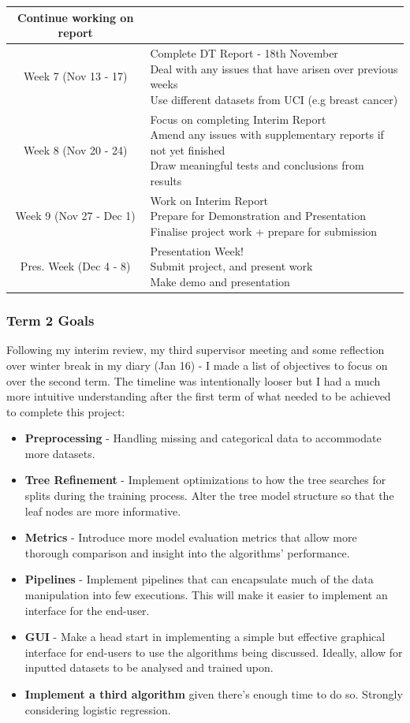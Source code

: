 \documentclass[letterpaper,10pt]{article}
\begin{document}
\begin{tabular}{|c|p{10cm}|}
{Continue working on report} \\
\hline
Week 7 (Nov 13 - 17) & 
\makecell[l]{Complete DT Report - 18th November \\
Deal with any issues that have arisen over previous weeks \\
Use different datasets from UCI (e.g breast cancer)} \\
\hline
Week 8 (Nov 20 - 24) & 
\makecell[l]{ Focus on completing Interim Report \\
Amend any issues with supplementary reports if not yet finished \\
Draw meaningful tests and conclusions from results } \\
\hline
Week 9 (Nov 27 - Dec 1) & 
\makecell[l]{Work on Interim Report \\
Prepare for Demonstration and Presentation \\
Finalise project work + prepare for submission} \\
\hline
Pres. Week (Dec 4 - 8) & 
\makecell[l]{Presentation Week!\\
Submit project, and present work \\
Make demo and presentation} \\
\hline
\end{tabular}

\subsubsection{Term 2 Goals} \label{successcriteria}
Following my interim review, my third supervisor meeting and some reflection over winter break in my diary (Jan 16) - I made a list of objectives to focus on over the second term. The timeline was intentionally looser but I had a much more intuitive understanding after the first term of what needed to be achieved to complete this project:
\begin{itemize}
    \item \textbf{Preprocessing} - Handling missing and categorical data to accommodate more datasets.
    \item \textbf{Tree Refinement} - Implement optimizations to how the tree searches for splits during the training process. Alter the tree model structure so that the leaf nodes are more informative.
    \item \textbf{Metrics} - Introduce more model evaluation metrics that allow more thorough comparison and insight into the algorithms' performance.
    \item \textbf{Pipelines} - Implement pipelines that can encapsulate much of the data manipulation into few executions. This will make it easier to implement an interface for the end-user.
    \item \textbf{GUI} - Make a head start in implementing a simple but effective graphical interface for end-users to use the algorithms being discussed. Ideally, allow for inputted datasets to be analysed and trained upon.
    \item \textbf{Implement a third algorithm} given there's enough time to do so. Strongly considering logistic regression.
\end{itemize}
\end{document}
